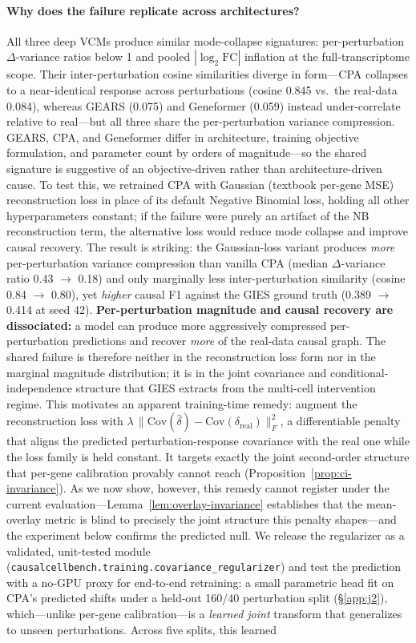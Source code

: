 \documentclass{article}
\theoremstyle{plain}
\theoremstyle{definition}
\theoremstyle{remark}
\begin{document}
\paragraph{Why does the failure replicate across architectures?}
All three deep VCMs produce similar mode-collapse signatures: per-perturbation $\Delta$-variance ratios below 1 and pooled $|\log_2 \mathrm{FC}|$ inflation at the full-transcriptome scope. Their inter-perturbation cosine similarities diverge in form---CPA collapses to a near-identical response across perturbations (cosine 0.845 vs.\ the real-data 0.084), whereas GEARS (0.075) and Geneformer (0.059) instead under-correlate relative to real---but all three share the per-perturbation variance compression. GEARS, CPA, and Geneformer differ in architecture, training objective formulation, and parameter count by orders of magnitude---so the shared signature is suggestive of an objective-driven rather than architecture-driven cause. To test this, we retrained CPA with Gaussian (textbook per-gene MSE) reconstruction loss in place of its default Negative Binomial loss, holding all other hyperparameters constant; if the failure were purely an artifact of the NB reconstruction term, the alternative loss would reduce mode collapse and improve causal recovery. The result is striking: the Gaussian-loss variant produces \emph{more} per-perturbation variance compression than vanilla CPA (median $\Delta$-variance ratio 0.43 $\to$ 0.18) and only marginally less inter-perturbation similarity (cosine 0.84 $\to$ 0.80), yet \emph{higher} causal F1 against the GIES ground truth (0.389 $\to$ 0.414 at seed 42). \textbf{Per-perturbation magnitude and causal recovery are dissociated:} a model can produce more aggressively compressed per-perturbation predictions and recover \emph{more} of the real-data causal graph. The shared failure is therefore neither in the reconstruction loss form nor in the marginal magnitude distribution; it is in the joint covariance and conditional-independence structure that GIES extracts from the multi-cell intervention regime. This motivates an apparent training-time remedy: augment the reconstruction loss with $\lambda\,\lVert \mathrm{Cov}(\hat\delta) - \mathrm{Cov}(\delta_{\text{real}})\rVert_F^2$, a differentiable penalty that aligns the predicted perturbation-response covariance with the real one while the loss family is held constant. It targets exactly the joint second-order structure that per-gene calibration provably cannot reach (Proposition~\ref{prop:ci-invariance}). As we now show, however, this remedy cannot register under the current evaluation---Lemma~\ref{lem:overlay-invariance} establishes that the mean-overlay metric is blind to precisely the joint structure this penalty shapes---and the experiment below confirms the predicted null. We release the regularizer as a validated, unit-tested module (\texttt{causalcellbench.training.covariance\_regularizer}) and test the prediction with a no-GPU proxy for end-to-end retraining: a small parametric head fit on CPA's predicted shifts under a held-out 160/40 perturbation split (\S\ref{app:j2}), which---unlike per-gene calibration---is a \emph{learned joint} transform that generalizes to unseen perturbations. Across five splits, this learned 
\end{document}
